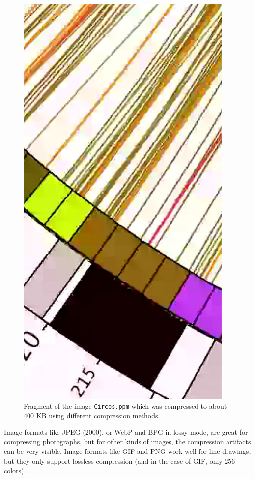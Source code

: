 \documentclass[a4paper,USenglish]{lipics}
\begin{document}
\begin{figure}
\begin{minipage}[b]{0.25\textwidth}
\includegraphics[width=0.95\textwidth]{images/c_webp}
\end{minipage}
\caption{ Fragment of the image {\tt Circos.ppm} which was compressed to about 400 KB using different compression methods.}
\label{fig:Circos_artefacts}
\end{figure}


Image formats like JPEG (2000), or WebP and BPG in lossy mode, are great for compressing photographs, but for other kinds of images,
the compression artifacts can be very visible. Image formats like GIF and PNG work well for line drawings,
but they only support lossless compression (and in the case of GIF, only 256 colors).
\end{document}
